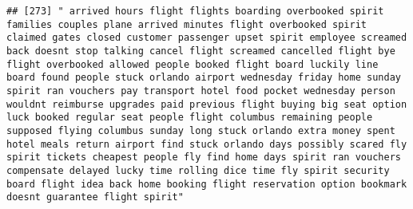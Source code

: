 \documentclass[
]{article}
\begin{document}
\begin{verbatim}
## [273] " arrived hours flight flights boarding overbooked spirit families couples plane arrived minutes flight overbooked spirit claimed gates closed customer passenger upset spirit employee screamed back doesnt stop talking cancel flight screamed cancelled flight bye flight overbooked allowed people booked flight board luckily line board found people stuck orlando airport wednesday friday home sunday spirit ran vouchers pay transport hotel food pocket wednesday person wouldnt reimburse upgrades paid previous flight buying big seat option luck booked regular seat people flight columbus remaining people supposed flying columbus sunday long stuck orlando extra money spent hotel meals return airport find stuck orlando days possibly scared fly spirit tickets cheapest people fly find home days spirit ran vouchers compensate delayed lucky time rolling dice time fly spirit security board flight idea back home booking flight reservation option bookmark doesnt guarantee flight spirit"                                                                                                                                                                                                                                                                                                                                                                                                                                                                                                                                                                                                                                                                                                                                                                         

\end{verbatim}
\end{document}
